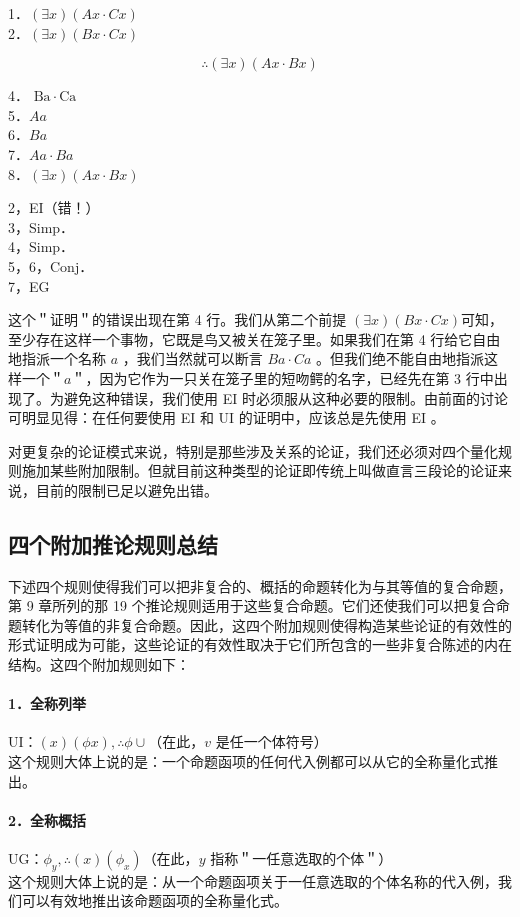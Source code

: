 1．$(\exists x)(A x \cdot C x)$\\
2．$(\exists x)(B x \cdot C x)$

$$
\therefore(\exists x)(A x \cdot B x)
$$

4． $\mathrm{Ba} \cdot \mathrm{Ca}$\\
5．$A a$\\
6．$B a$\\
7．$A a \cdot B a$\\
8．$(\exists x)(A x \cdot B x)$

2，EI（错！）\\
3，Simp．\\
4，Simp．\\
5，6，Conj．\\
7，EG

这个＂证明＂的错误出现在第 4 行。我们从第二个前提 $(\exists x)(B x \cdot C x)$可知，至少存在这样一个事物，它既是鸟又被关在笼子里。如果我们在第 4 行给它自由地指派一个名称 $a$ ，我们当然就可以断言 $B a \cdot C a$ 。但我们绝不能自由地指派这样一个＂$a$＂，因为它作为一只关在笼子里的短吻鳄的名字，已经先在第 3 行中出现了。为避免这种错误，我们使用 EI 时必须服从这种必要的限制。由前面的讨论可明显见得：在任何要使用 EI 和 UI 的证明中，应该总是先使用 EI 。

对更复杂的论证模式来说，特别是那些涉及关系的论证，我们还必须对四个量化规则施加某些附加限制。但就目前这种类型的论证即传统上叫做直言三段论的论证来说，目前的限制已足以避免出错。

\subsection{四个附加推论规则总结}

下述四个规则使得我们可以把非复合的、概括的命题转化为与其等值的复合命题，第 9 章所列的那 19 个推论规则适用于这些复合命题。它们还使我们可以把复合命题转化为等值的非复合命题。因此，这四个附加规则使得构造某些论证的有效性的形式证明成为可能，这些论证的有效性取决于它们所包含的一些非复合陈述的内在结构。这四个附加规则如下：

\paragraph{1．全称列举}
UI：$(x)(\phi x), \therefore \phi \cup$（在此，$v$ 是任一个体符号）\\
这个规则大体上说的是：一个命题函项的任何代入例都可以从它的全称量化式推出。

\paragraph{2．全称概括}
UG：$\phi_{y}, \therefore(x)\left(\phi_{x}\right)$（在此，$y$ 指称＂一任意选取的个体＂）\\
这个规则大体上说的是：从一个命题函项关于一任意选取的个体名称的代入例，我们可以有效地推出该命题函项的全称量化式。

